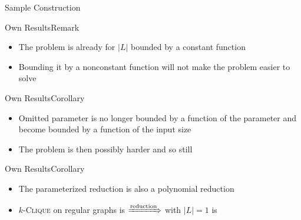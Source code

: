 \begin{frame}{Sample Construction}
    
\end{frame}

\begin{frame}{Own Results}{Remark}
    \begin{center}
    \end{center}

    \begin{itemize}
        \item The problem is \Wh already for $|L|$ bounded by a constant function
        \item Bounding it by a nonconstant function will not make the problem easier to solve
    \end{itemize}
\end{frame}

\begin{frame}{Own Results}{Corollary}
    \begin{center}
    \end{center}

    \begin{itemize}
        \item Omitted parameter is no longer bounded by a function of the parameter and become bounded by a function of the input size
        \item The problem is then possibly harder and so still \Wh
    \end{itemize}
\end{frame}

\begin{frame}{Own Results}{Corollary}
    \begin{center}
    \end{center}

    \begin{itemize}
        \item The parameterized reduction is also a polynomial reduction
        \item $k$-\textsc{Clique} on regular graphs is \NPh $\xRightarrow{\text{reduction}}$ \HLshort with $|L|=1$ is \NPh
    \end{itemize}
\end{frame}

